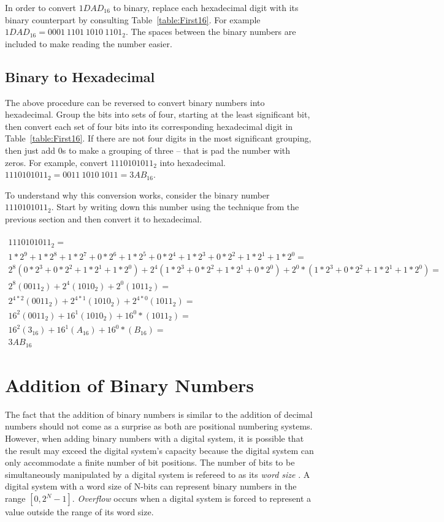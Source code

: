 In order to convert $1DAD_{16}$ to binary, replace each hexadecimal
digit with its binary counterpart by consulting Table~\ref{table:First16}.
For example $1DAD_{16} = 0001~1101~1010~1101_{2}$.  The spaces between the
binary numbers are included to make reading the number easier.

\subsection{Binary to Hexadecimal}
The above procedure can be reversed to convert binary numbers into 
hexadecimal.  Group the bits into sets of four, starting at the least
significant bit, then convert each set of four bits into its corresponding
hexadecimal digit in Table~\ref{table:First16}.  
If there are not four digits in the most significant 
grouping, then just add 0s to make a grouping of three -- that is 
pad the number with zeros.  For example, convert  $1110101011_2$ into 
hexadecimal. $1110101011_2 = 0011~1010~1011 = 3AB_{16}$.

To understand why this conversion works, consider the binary 
number $1110101011_2$.  Start by writing down this number using the 
technique from the previous section and then convert it to hexadecimal.
\\ \\
{\tiny
$\begin{array}{l}
1110101011_2= \\
1*2^9+1*2^8+1*2^7+0*2^6+1*2^5+0*2^4+1*2^3+0*2^2+1*2^1+1*2^0 = \\
2^8(0*2^3+0*2^2+1*2^1+1*2^0) + 2^4(1*2^3+0*2^2+1*2^1+0*2^0) + 2^0*(1*2^3+0*2^2+1*2^1+1*2^0) =\\
2^8(0011_2) + 2^4(1010_2) +  2^0(1011_2) =\\
2^{4*2}(0011_2) + 2^{4*1}(1010_2) +  2^{4*0}(1011_2) =\\
16^2(0011_2) + 16^1(1010_2) + 16^0*(1011_2) =\\
16^2(3_{16}) + 16^1(A_{16}) + 16^0*(B_{16}) =\\
3AB_{16}
\end{array}$
} 


\section{Addition of Binary Numbers}
\label{page:addition}
The fact that the addition of binary numbers is similar to the 
addition of decimal numbers should not come as a surprise as both
are positional numbering systems. However, when adding binary numbers
with a digital system, it is possible that the result may exceed the
digital system's capacity because the digital system can only accommodate a 
finite number of bit positions.  The number of bits to be 
simultaneously manipulated by a digital system is refereed to as 
its \textit{ word size} .  A digital system with a
word size of N-bits can represent binary numbers in the range 
$[0, 2^N-1]$.  \textit{ Overflow}  occurs when a 
digital system is forced to represent a value outside the range 
of its word size.


